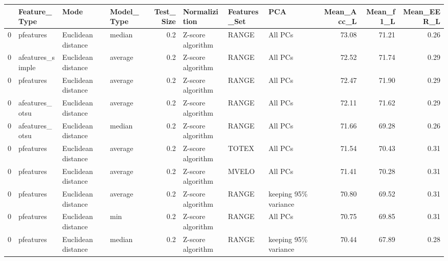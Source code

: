 \begin{tabular}{llllrlllrrr}
\toprule
{} &      Feature\_Type &                Mode & Model\_Type &  Test\_Size &      Normalizition & Features\_Set &                   PCA &  Mean\_Acc\_L &  Mean\_f1\_L &  Mean\_EER\_L \\
\midrule
0 &         pfeatures &  Euclidean distance &     median &        0.2 &  Z-score algorithm &        RANGE &               All PCs &       73.08 &      71.21 &        0.26 \\
0 &  afeatures\_simple &  Euclidean distance &    average &        0.2 &  Z-score algorithm &        RANGE &               All PCs &       72.52 &      71.74 &        0.29 \\
0 &         pfeatures &  Euclidean distance &    average &        0.2 &  Z-score algorithm &        RANGE &               All PCs &       72.47 &      71.90 &        0.29 \\
0 &    afeatures\_otsu &  Euclidean distance &    average &        0.2 &  Z-score algorithm &        RANGE &               All PCs &       72.11 &      71.62 &        0.29 \\
0 &    afeatures\_otsu &  Euclidean distance &     median &        0.2 &  Z-score algorithm &        RANGE &               All PCs &       71.66 &      69.28 &        0.26 \\
0 &         pfeatures &  Euclidean distance &    average &        0.2 &  Z-score algorithm &        TOTEX &               All PCs &       71.54 &      70.43 &        0.31 \\
0 &         pfeatures &  Euclidean distance &    average &        0.2 &  Z-score algorithm &        MVELO &               All PCs &       71.41 &      70.28 &        0.31 \\
0 &         pfeatures &  Euclidean distance &    average &        0.2 &  Z-score algorithm &        RANGE &  keeping 95\% variance &       70.80 &      69.52 &        0.31 \\
0 &         pfeatures &  Euclidean distance &        min &        0.2 &  Z-score algorithm &        RANGE &               All PCs &       70.75 &      69.85 &        0.31 \\
0 &         pfeatures &  Euclidean distance &     median &        0.2 &  Z-score algorithm &        RANGE &  keeping 95\% variance &       70.44 &      67.89 &        0.28 \\
\bottomrule
\end{tabular}
